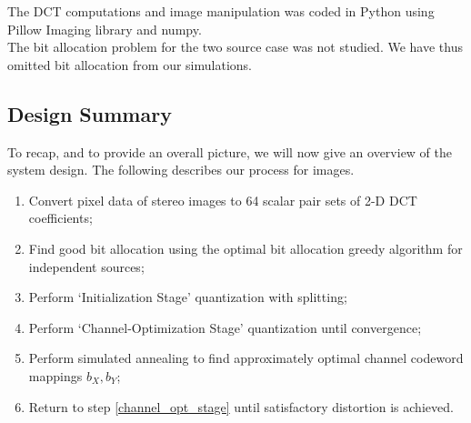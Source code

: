 The DCT computations and image manipulation was coded in Python using Pillow Imaging library and numpy.\\

The bit allocation problem for the two source case was not studied. We have thus omitted bit allocation from our simulations.


\subsection{Design Summary}
To recap, and to provide an overall picture, we will now give an overview of the system design. The following describes our process for images.\\

\begin{enumerate}
    \item Convert pixel data of stereo images to 64 scalar pair sets of 2-D DCT coefficients;
    \item Find good bit allocation using the optimal bit allocation greedy algorithm for independent sources;
    \item Perform `Initialization Stage' quantization with splitting;
    \item \label{channel_opt_stage}
    Perform `Channel-Optimization Stage' quantization until convergence;
    \item Perform simulated annealing to find approximately optimal channel codeword mappings $b_X, b_Y$;
    \item Return to step \ref{channel_opt_stage} until satisfactory distortion is achieved.
\end{enumerate}

